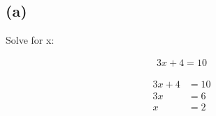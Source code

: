 \subsection*{(a)}

\begin{tcolorbox}[
    colback=blue!5,
    colframe=blue!75!black,
    title=\textbf{Problem},
    fonttitle=\large,
    arc=2mm
]
    Solve for x:

    \begin{align*}
        3x + 4 = 10
    \end{align*}

\end{tcolorbox}

\begin{align*}
    3x + 4 & = 10 \\
    3x & = 6 \\
    x & = 2 \\
\end{align*}